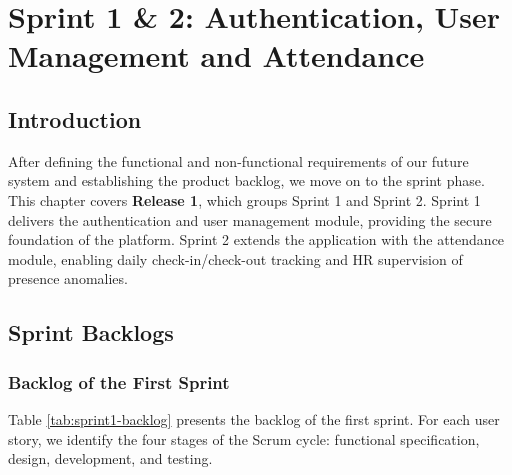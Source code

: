 \chapter{Sprint 1 \& 2: Authentication, User Management and Attendance}

\section*{Introduction}
After defining the functional and non-functional requirements of our future system and establishing the product backlog, we move on to the sprint phase. This chapter covers \textbf{Release 1}, which groups Sprint 1 and Sprint 2. Sprint 1 delivers the authentication and user management module, providing the secure foundation of the platform. Sprint 2 extends the application with the attendance module, enabling daily check-in/check-out tracking and HR supervision of presence anomalies.

\section{Sprint Backlogs}

\subsection{Backlog of the First Sprint}
Table \ref{tab:sprint1-backlog} presents the backlog of the first sprint. For each user story, we identify the four stages of the Scrum cycle: functional specification, design, development, and testing.

